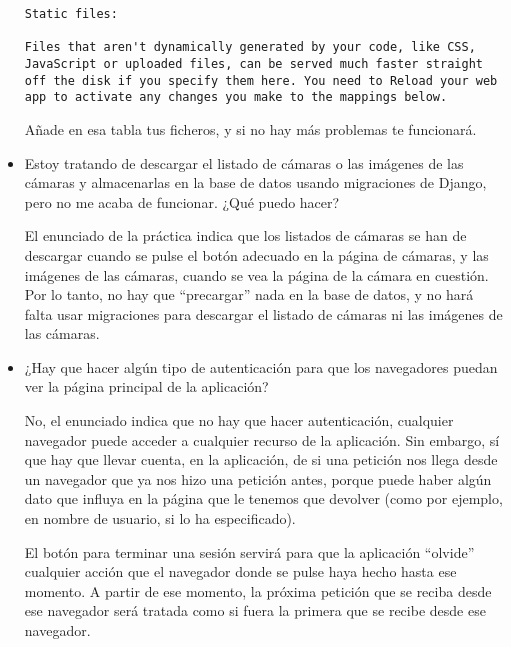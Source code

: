 \begin{itemize}
  \begin{verbatim}
Static files:

Files that aren't dynamically generated by your code, like CSS, JavaScript or uploaded files, can be served much faster straight off the disk if you specify them here. You need to Reload your web app to activate any changes you make to the mappings below.
\end{verbatim}

  Añade en esa tabla tus ficheros, y si no hay más problemas te funcionará.

\item Estoy tratando de descargar el listado de cámaras o las imágenes de las cámaras y almacenarlas en la base de datos usando migraciones de Django, pero no me acaba de funcionar. ¿Qué puedo hacer?

  El enunciado de la práctica indica que los listados de cámaras se han de descargar cuando se pulse el botón adecuado en la página de cámaras, y las imágenes de las cámaras, cuando se vea la página de la cámara en cuestión. Por lo tanto, no hay que ``precargar'' nada en la base de datos, y no hará falta usar migraciones para descargar el listado de cámaras ni las imágenes de las cámaras.

\item ¿Hay que hacer algún tipo de autenticación para que los navegadores puedan ver la página principal de la aplicación?

  No, el enunciado indica que no hay que hacer autenticación, cualquier navegador puede acceder a cualquier recurso de la aplicación. Sin embargo, sí que hay que llevar cuenta, en la aplicación, de si una petición nos llega desde un navegador que ya nos hizo una petición antes, porque puede haber algún dato que influya en la página que le tenemos que devolver (como por ejemplo, en nombre de usuario, si lo ha especificado).

  El botón para terminar una sesión servirá para que la aplicación ``olvide'' cualquier acción que el navegador donde se pulse haya hecho hasta ese momento. A partir de ese momento, la próxima petición que se reciba desde ese navegador será tratada como si fuera la primera que se recibe desde ese navegador.
\end{itemize}

